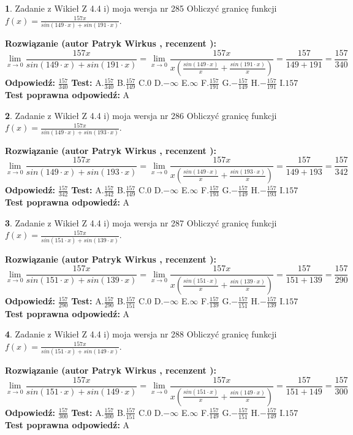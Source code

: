 \documentclass[12pt, a4paper]{article}
\theoremstyle{definition} %
\newtheorem{zad}{}
\newcommand{\zadStart}[1]{\begin{zad}#1\newline}
\newcommand{\zadStop}{\end{zad}}
\newcommand{\rozwStart}[2]{\noindent \textbf{Rozwiązanie (autor #1 , recenzent #2): }\newline}
\newcommand{\rozwStop}{\newline}
\newcommand{\odpStart}{\noindent \textbf{Odpowiedź:}\newline}
\newcommand{\odpStop}{\newline}
\newcommand{\testStart}{\noindent \textbf{Test:}\newline}
\newcommand{\testStop}{\newline}
\newcommand{\kluczStart}{\noindent \textbf{Test poprawna odpowiedź:}\newline}
\newcommand{\kluczStop}{\newline}
\begin{document}
\zadStart{Zadanie z Wikieł Z 4.4 i) moja wersja nr 285}
Obliczyć granicę funkcji $f(x)=\frac{157x}{sin(149\cdot x) +sin(191\cdot x)}$.
\zadStop
\rozwStart{Patryk Wirkus}{}
$$\lim\limits_{x\to 0}\frac{157x}{sin(149\cdot x) +sin(191\cdot x)}=\lim\limits_{x\to 0}\frac{157x}{x(\frac{sin(149\cdot x)}{x}+\frac{sin(191\cdot x)}{x})}=\frac{157}{149+191} = \frac{157}{340}$$
\rozwStop
\odpStart
$\frac{157}{340}$
\odpStop
\testStart
A.$\frac{157}{340}$
B.$\frac{157}{149}$
C.$0$
D.$-\infty$
E.$\infty$
F.$\frac{157}{191}$
G.$-\frac{157}{149}$
H.$-\frac{157}{191}$
I.$157$
\testStop
\kluczStart
A
\kluczStop



\zadStart{Zadanie z Wikieł Z 4.4 i) moja wersja nr 286}
Obliczyć granicę funkcji $f(x)=\frac{157x}{sin(149\cdot x) +sin(193\cdot x)}$.
\zadStop
\rozwStart{Patryk Wirkus}{}
$$\lim\limits_{x\to 0}\frac{157x}{sin(149\cdot x) +sin(193\cdot x)}=\lim\limits_{x\to 0}\frac{157x}{x(\frac{sin(149\cdot x)}{x}+\frac{sin(193\cdot x)}{x})}=\frac{157}{149+193} = \frac{157}{342}$$
\rozwStop
\odpStart
$\frac{157}{342}$
\odpStop
\testStart
A.$\frac{157}{342}$
B.$\frac{157}{149}$
C.$0$
D.$-\infty$
E.$\infty$
F.$\frac{157}{193}$
G.$-\frac{157}{149}$
H.$-\frac{157}{193}$
I.$157$
\testStop
\kluczStart
A
\kluczStop



\zadStart{Zadanie z Wikieł Z 4.4 i) moja wersja nr 287}
Obliczyć granicę funkcji $f(x)=\frac{157x}{sin(151\cdot x) +sin(139\cdot x)}$.
\zadStop
\rozwStart{Patryk Wirkus}{}
$$\lim\limits_{x\to 0}\frac{157x}{sin(151\cdot x) +sin(139\cdot x)}=\lim\limits_{x\to 0}\frac{157x}{x(\frac{sin(151\cdot x)}{x}+\frac{sin(139\cdot x)}{x})}=\frac{157}{151+139} = \frac{157}{290}$$
\rozwStop
\odpStart
$\frac{157}{290}$
\odpStop
\testStart
A.$\frac{157}{290}$
B.$\frac{157}{151}$
C.$0$
D.$-\infty$
E.$\infty$
F.$\frac{157}{139}$
G.$-\frac{157}{151}$
H.$-\frac{157}{139}$
I.$157$
\testStop
\kluczStart
A
\kluczStop



\zadStart{Zadanie z Wikieł Z 4.4 i) moja wersja nr 288}
Obliczyć granicę funkcji $f(x)=\frac{157x}{sin(151\cdot x) +sin(149\cdot x)}$.
\zadStop
\rozwStart{Patryk Wirkus}{}
$$\lim\limits_{x\to 0}\frac{157x}{sin(151\cdot x) +sin(149\cdot x)}=\lim\limits_{x\to 0}\frac{157x}{x(\frac{sin(151\cdot x)}{x}+\frac{sin(149\cdot x)}{x})}=\frac{157}{151+149} = \frac{157}{300}$$
\rozwStop
\odpStart
$\frac{157}{300}$
\odpStop
\testStart
A.$\frac{157}{300}$
B.$\frac{157}{151}$
C.$0$
D.$-\infty$
E.$\infty$
F.$\frac{157}{149}$
G.$-\frac{157}{151}$
H.$-\frac{157}{149}$
I.$157$
\testStop
\kluczStart
A
\kluczStop
\end{document}
